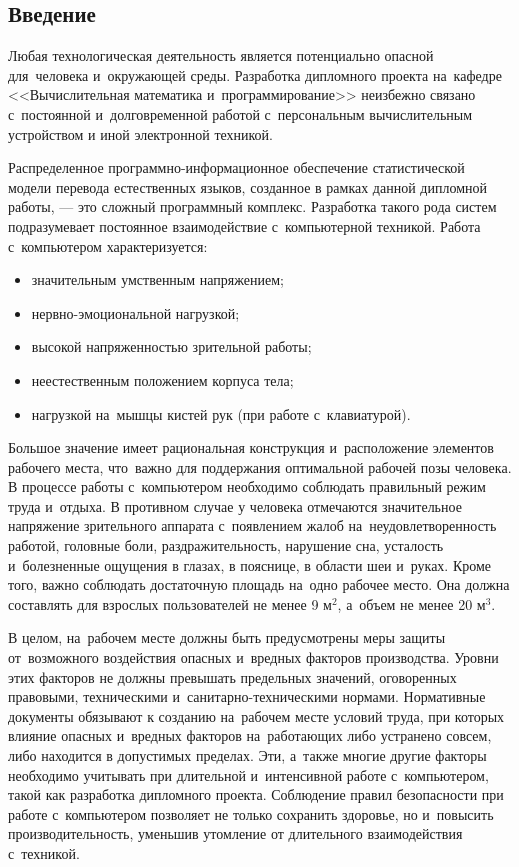 
\subsection{Введение}

Любая технологическая деятельность является потенциально опасной \\
для~человека и~окружающей среды.
Разработка дипломного проекта на~кафедре <<Вычислительная математика  и~программирование>> 
неизбежно связано с~постоянной и~долговременной 
работой с~персональным вычислительным устройством 
и иной электронной техникой. 

Распределенное программно-информационное обеспечение 
статистической модели перевода естественных языков,
созданное в рамках данной дипломной работы, 
--- это сложный программный комплекс.
Разработка такого рода систем подразумевает 
постоянное взаимодействие с~компьютерной техникой.
Работа с~компьютером характеризуется:
\begin{itemize}
	\item  значительным умственным напряжением;
	\item  нервно-эмоциональной нагрузкой;
	\item высокой напряженностью зрительной работы;
	\item неестественным положением корпуса тела;
	\item нагрузкой на~мышцы кистей рук (при работе с~клавиатурой). 
\end{itemize}
Большое значение имеет рациональная конструкция и~расположение элементов рабочего места, 
что~важно для поддержания оптимальной рабочей позы человека.
В процессе работы с~компьютером необходимо соблюдать правильный режим труда и~отдыха. 
В противном случае у человека отмечаются значительное
напряжение зрительного аппарата с~появлением жалоб на~неудовлетворенность
работой, головные боли, раздражительность, нарушение сна, усталость 
и~болезненные ощущения в глазах, в пояснице, в области шеи и~руках.
Кроме того, важно соблюдать достаточную площадь на~одно рабочее место. 
Она должна составлять для взрослых пользователей не менее 9 м$^2$, 
а~объем не менее 20 м$^3$.

В целом, на~рабочем месте должны быть предусмотрены меры защиты 
от~возможного воздействия опасных и~вредных факторов производства. 
Уровни этих факторов не должны превышать предельных значений, 
оговоренных правовыми, техническими и~санитарно-техническими нормами. 
Нормативные документы обязывают к созданию на~рабочем месте условий
труда, при которых влияние опасных и~вредных факторов на~работающих либо
устранено совсем, либо находится в допустимых пределах.
Эти, а~также многие другие факторы необходимо учитывать при длительной 
и~интенсивной работе с~компьютером, такой как разработка дипломного проекта.
Соблюдение правил безопасности при работе с~компьютером позволяет не
только сохранить здоровье, но и~повысить производительность, уменьшив
утомление от длительного взаимодействия с~техникой.

